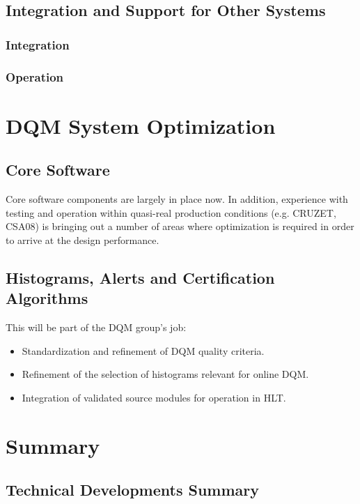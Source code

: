 \documentclass[a4paper]{cmspaper}
\begin{document}
\subsection{Integration and Support for Other Systems}

\subsubsection*{Integration}

\subsubsection*{Operation}


\section{DQM System Optimization}

\subsection{Core Software}
Core software components are largely in place now. 
In addition, experience with testing and operation within quasi-real production conditions
(e.g. CRUZET, CSA08) is bringing out a number of areas where
optimization is required in order to arrive at the design performance.

\subsection{Histograms, Alerts and Certification Algorithms}

This will be part of the DQM group's job:
\begin{itemize}
\item Standardization and refinement of DQM quality criteria.
\item Refinement of the selection of histograms relevant for online DQM.
\item Integration of validated source modules for operation in HLT.
\end{itemize}

\section{Summary}

\subsection{Technical Developments Summary}
\end{document}
